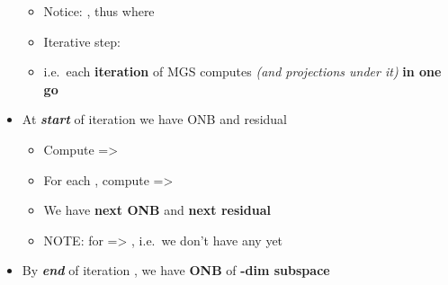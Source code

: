 \begin{itemize}
\begin{itemize}
  \item
    Notice: , thus
    where
  \item
    Iterative step:
  \item
    i.e.~each \textbf{iteration } of MGS computes
     \emph{(and
    projections under it)} \textbf{in one go}
  \end{itemize}
\item
  At \textbf{\emph{start}} of iteration 
  we have ONB
  and residual

  \begin{itemize}
  
  \item
    Compute
    =\textgreater{}
  \item
    For each , compute
    =\textgreater{}
  \item
    We have \textbf{next ONB}
     and
    \textbf{next residual}
  \item
    NOTE: for  =\textgreater{}
    ,
    i.e.~we don't have any yet
  \end{itemize}
\item
  By \textbf{\emph{end}} of iteration , we have \textbf{ONB}
  of \textbf{-dim subspace}


\end{itemize}
